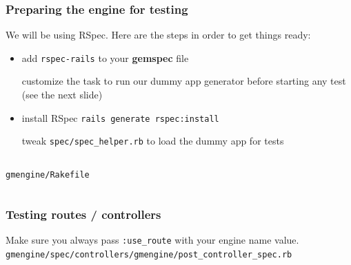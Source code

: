\documentclass[compress]{beamer}
\begin{document}
\begin{frame}
\frametitle{Preparing the engine for testing}

We will be using RSpec. Here are the steps in order to get things ready:
\begin{itemize}
  \item add \texttt{rspec-rails} to your \textbf{gemspec} file
    \begin{item}
      customize the task to run our dummy app generator before starting any test
      (see the next slide)
    \end{item}
  \item install RSpec \texttt{rails generate rspec:install}
  \begin{item}
    tweak \texttt{spec/spec\_helper.rb} to load the dummy app for tests
    \inputminted[fontsize=\tiny,gobble=0,linenos=true,firstline=3,lastline=7]{ruby}{code/gmengine/spec/spec_helper.rb}
  \end{item}
\end{itemize}
\end{frame}

\begin{frame}
  \texttt{gmengine/Rakefile}
  \inputminted[fontsize=\tiny,gobble=0,linenos=true,firstline=26,lastline=0]{ruby}{code/gmengine/Rakefile}
\end{frame}

\begin{frame}
\frametitle{Testing routes / controllers}
  Make sure you always pass \texttt{:use\_route} with your engine name value.
  \\
  \small\texttt{gmengine/spec/controllers/gmengine/post\_controller\_spec.rb}
  \inputminted[fontsize=\tiny,gobble=0,linenos=true,firstline=0,lastline=0]{ruby}{code/gmengine/spec/controllers/gmengine/posts_controller_spec.rb}
\end{frame}
\end{document}
